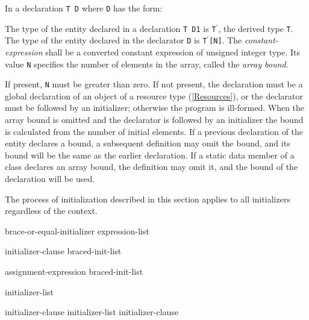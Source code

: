 
\p In a declaration \texttt{T D} where \texttt{D} has the form:

\begin{innergrammar}
   \terminal{\lbrack}  \terminal{\rbrack} 
\end{innergrammar}

\p The type of the entity declared in a declaration \texttt{T D1} is
\texttt{T$^\prime$}, the derived type \texttt{T}. The type of the entity
declared in the declarator \texttt{D} is \texttt{T$^\prime$[N]}. The
\textit{constant-expression} shall be a converted constant expression of
unsigned integer type. Its value \texttt{N} specifies the number of elements in
the array, called the \textit{array bound}.

\p If present, \texttt{N} must be greater than zero. If not present, the
declaration must be a global declaration of an object of a resource type
(\ref{Resources}), or the declarator must be followed by an initializer;
otherwise the program is ill-formed. When the array bound is omitted and the
declarator is followed by an initializer the bound is calculated from the number
of initial elements. If a previous declaration of the entity declares a bound, a
subsequent definition may omit the bound, and its bound will be the same as the
earlier declaration. If a static data member of a class declares an array bound,
the definition may omit it, and the bound of the declaration will be used.


\p The process of initialization described in this section applies to all
initializers regardless of the context.

\begin{grammar}
  \br
  brace-or-equal-initializer\br
  \terminal{(} expression-list \terminal{)}\br

  \br
  \terminal{=} initializer-clause\br
  braced-init-list\br

  \br
  assignment-expression\br
  braced-init-list\br

  \br
  \terminal{\{} initializer-list \opt{\terminal{,}} \terminal{\}}\br
  \terminal{\{} \terminal{\}}\br

  \br
  initializer-clause\br
  initializer-list \terminal{,} initializer-clause\br
\end{grammar}

